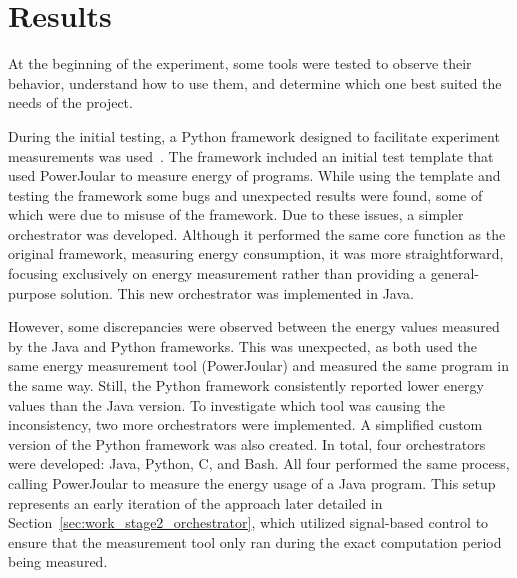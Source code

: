 \chapter{Results}\label{chapter:results}


At the beginning of the experiment, some tools were tested to observe their behavior, understand how to use them, and determine which one best suited the needs of the project.

During the initial testing, a Python framework designed to facilitate experiment measurements was used~\cite{S2_Group_Experiment_Runner}. The framework included an initial test template that used PowerJoular to measure energy of programs. While using the template and testing the framework some bugs and unexpected results were found, some of which were due to misuse of the framework.
Due to these issues, a simpler orchestrator was developed. Although it performed the same core function as the original framework, measuring energy consumption, it was more straightforward, focusing exclusively on energy measurement rather than providing a general-purpose solution. This new orchestrator was implemented in Java.

However, some discrepancies were observed between the energy values measured by the Java and Python frameworks. This was unexpected, as both used the same energy measurement tool (PowerJoular) and measured the same program in the same way. Still, the Python framework consistently reported lower energy values than the Java version.
To investigate which tool was causing the inconsistency, two more orchestrators were implemented. A simplified custom version of the Python framework was also created. In total, four orchestrators were developed: Java, Python, C, and Bash. All four performed the same process, calling PowerJoular to measure the energy usage of a Java program.
This setup represents an early iteration of the approach later detailed in Section~\ref{sec:work_stage2_orchestrator}, which utilized signal-based control to ensure that the measurement tool only ran during the exact computation period being measured.

